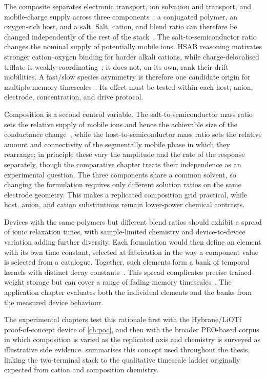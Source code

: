 \documentclass[12pt, twoside]{report}
\begin{document}
The composite separates electronic transport, ion solvation and transport, and mobile-charge supply across three components~\cite{Pei1995}: a conjugated polymer, an oxygen-rich host, and a salt. Salt, cation, and blend ratio can therefore be changed independently of the rest of the stack~\cite{VanDeBurgt2018}. The salt-to-semiconductor ratio changes the nominal supply of potentially mobile ions. HSAB reasoning motivates stronger cation--oxygen binding for harder alkali cations, while charge-delocalised triflate is weakly coordinating~\cite{BruceVincent1993}; it does not, on its own, rank their drift mobilities. A fast/slow species asymmetry is therefore one candidate origin for multiple memory timescales~\cite{Erokhin2005, Smerieri2008, Berzina2009}. Its effect must be tested within each host, anion, electrode, concentration, and drive protocol.

Composition is a second control variable. The salt-to-semiconductor mass ratio sets the relative supply of mobile ions and hence the achievable size of the conductance change~\cite{Armand1989, Gray1991}, while the host-to-semiconductor mass ratio sets the relative amount and connectivity of the segmentally mobile phase in which they rearrange; in principle these vary the amplitude and the rate of the response separately, though the comparative chapter treats their independence as an experimental question. The three components share a common solvent, so changing the formulation requires only different solution ratios on the same electrode geometry. This makes a replicated composition grid practical, while host, anion, and cation substitutions remain lower-power chemical contrasts.

Devices with the same polymers but different blend ratios should exhibit a spread of ionic relaxation times, with sample-limited chemistry and device-to-device variation adding further diversity. Each formulation would then define an element with its own time constant, selected at fabrication in the way a component value is selected from a catalogue. Together, such elements form a bank of temporal kernels with distinct decay constants~\cite{Tanaka2019, Dambre2012}. This spread complicates precise trained-weight storage but can cover a range of fading-memory timescales~\cite{Du2017, Midya2019, Zhong2021, Cucchi2021}. The application chapter evaluates both the individual elements and the banks from the measured device behaviour.

The experimental chapters test this rationale first with the Hybrane/LiOTf proof-of-concept device of \cref{ch:poc}, and then with the broader PEO-based corpus in which composition is varied as the replicated axis and chemistry is surveyed as illustrative side evidence.  summarises this concept used throughout the thesis, linking the two-terminal stack to the qualitative timescale ladder originally expected from cation and composition chemistry.
\end{document}
